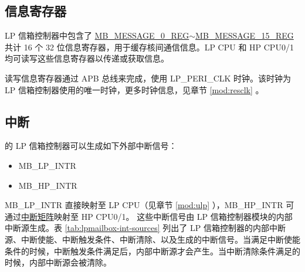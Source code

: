 \documentclass[main\_\_CN.tex]{subfiles}
\begin{document}
\subsection{信息寄存器}
LP 信箱控制器中包含了 \hyperref[regdesc:MBMESSAGE0REG]{MB\_MESSAGE\_0\_REG}$\sim$\hyperref[regdesc:MBMESSAGE15REG]{MB\_MESSAGE\_15\_REG} 共计 16 个 32 位信息寄存器，用于缓存核间通信信息。LP CPU 和 HP CPU0/1 均可读写这些信息寄存器以传递或获取信息。

读写信息寄存器通过 APB 总线来完成，使用 LP\_PERI\_CLK 时钟。该时钟为 LP 信箱控制器使用的唯一时钟，更多时钟信息，见章节 \ref{mod:resclk} \textit{}。

\subsection{中断}
\label{sec:lpmailbox-interrupt}

\chipname{} 的 LP 信箱控制器可以生成如下外部中断信号：
    \begin{itemize}
        \item MB\_LP\_INTR
        \item MB\_HP\_INTR
    \end{itemize}
MB\_LP\_INTR 直接映射至 LP CPU（见章节 \ref{mod:ulp} \textit{}），MB\_HP\_INTR 可通过\hyperref[mod:intmtrx]{中断矩阵}映射至 HP CPU0/1。
这些中断信号由 LP 信箱控制器模块的内部中断源生成。表 \ref{tab:lpmailbox-int-sources} 列出了 LP 信箱控制器的内部中断源、中断使能、中断触发条件、中断清除、以及生成的中断信号。当满足中断使能条件的时候，中断触发条件满足后，内部中断源才会产生。当中断清除条件满足的时候，内部中断源会被清除。
\end{document}
